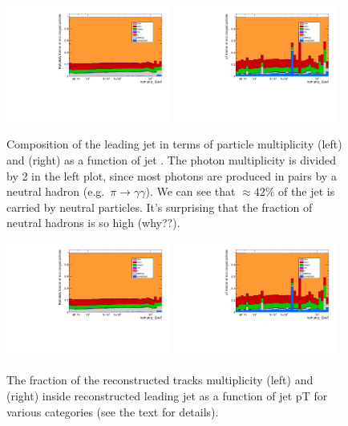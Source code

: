 \begin{figure}[b]
	\centering
	\includegraphics[width=0.48\textwidth,page=3]{figures/jet_comp_study_powheg_Tight_MultiplicityFraction.pdf}
	\includegraphics[width=0.48\textwidth,page=3]{figures/jet_comp_study_powheg_Tight_pTFraction.pdf}
	\caption{Composition of the leading jet in terms of particle multiplicity (left) and \pt{} (right) as a function of jet \pt{}.
		The photon multiplicity is divided by 2 in the left plot, since most photons are produced in pairs by a neutral hadron (e.g.\ $\pi\to\gamma\gamma$). 
		We can see that $\approx 42$\% of the jet \pt{} is carried by neutral particles. It's surprising that the fraction of neutral hadrons is so high (why??).}
	\label{fig:truthJetComp}
\end{figure}


\begin{figure}
\centering
\includegraphics[width=0.48\textwidth,page=1]{figures/jet_comp_study_powheg_Tight_MultiplicityFraction.pdf}
\includegraphics[width=0.48\textwidth,page=1]{figures/jet_comp_study_powheg_Tight_pTFraction.pdf}
\caption {The fraction of the reconstructed tracks multiplicity (left) and \pT (right) inside reconstructed leading jet as a function of jet pT for various categories (see the text for details).}
\label{fig:fraction of charged particles in reco jet}
\end{figure}


